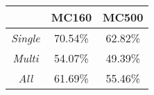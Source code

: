 \begin{tabular}{c|c|c|}
\cline{2-3}
\textbf{}                             & \textbf{MC160} & \textbf{MC500} \\ \hline
\multicolumn{1}{|c|}{\textit{Single}} & 70.54\%        & 62.82\%        \\ \hline
\multicolumn{1}{|c|}{\textit{Multi}}  & 54.07\%        & 49.39\%        \\ \hline
\multicolumn{1}{|c|}{\textit{All}}    & 61.69\%        & 55.46\%        \\ \hline
\end{tabular}
